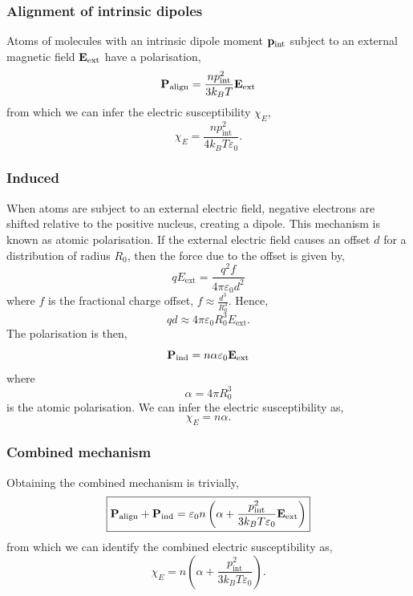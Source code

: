 \documentclass{book}
\begin{document}
\subsubsection{Alignment of intrinsic dipoles}
Atoms of molecules with an intrinsic dipole moment $\vb{p}_{\text{int}}$ subject to an external magnetic field $\vb{E}_{\text{ext}}$ have a polarisation,
\begin{equation}
	\vb{P}_{\text{align}} = \frac{np_{\text{int}}^2}{3k_BT}\vb{E}_{\text{ext}}
\end{equation}
from which we can infer the electric susceptibility $\chi_E$,
\begin{equation}
	\chi_E = \frac{np_{\text{int}}^2}{4k_BT\varepsilon_0}.
\end{equation}
\subsubsection{Induced}
When atoms are subject to an external electric field, negative electrons are shifted relative to the positive nucleus, creating a dipole. This mechanism is known as atomic polarisation. If the external electric field causes an offset $d$ for a distribution of radius $R_0$, then the force due to the offset is given by,
\begin{equation}
	qE_{\text{ext}} = \frac{q^2f}{4\pi\varepsilon_0d^2}
\end{equation}
where $f$ is the fractional charge offset, $f \approx \frac{d^3}{R_0^3}$. Hence,
\begin{equation}
	qd \approx 4\pi\varepsilon_0R_0^3E_{\text{ext}}.
\end{equation}
The polarisation is then,
\begin{equation}
	\vb{P}_{\text{ind}} = n\alpha \varepsilon_0\vb{E}_{\text{ext}}
\end{equation}
where 
\begin{equation}
	\alpha = 4\pi R_0^3
\end{equation}
is the atomic polarisation. We can infer the electric susceptibility as,
\begin{equation}
	\chi_E = n\alpha.
\end{equation}
\subsubsection{Combined mechanism}
Obtaining the combined mechanism is trivially,
\begin{equation}
	\boxed{\vb{P}_{\text{align}} + \vb{P}_{\text{ind}} = \varepsilon_0n\left(\alpha + \frac{p_{\text{int}}^2}{3k_BT\varepsilon_0}\vb{E}_{\text{ext}}\right)}
\end{equation}
from which we can identify the combined electric susceptibility as,
\begin{equation}
	\boxed{\chi_E = n\left(\alpha + \frac{p_{\text{int}}^2}{3k_BT\varepsilon_0}\right)}.
\end{equation}
\end{document}
